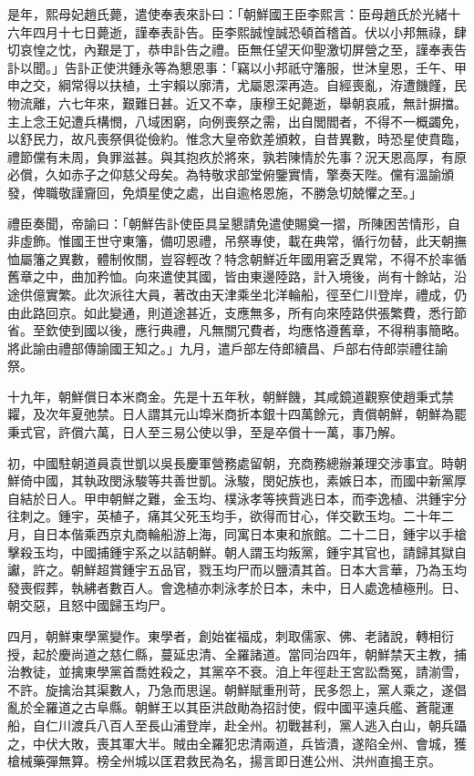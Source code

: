 \begin{pinyinscope}
是年，熙母妃趙氏薨，遣使奉表來訃曰：「朝鮮國王臣李熙言：臣母趙氏於光緒十六年四月十七日薨逝，謹奉表訃告。臣李熙誠惶誠恐頓首稽首。伏以小邦無祿，肆切哀惶之忱，內艱是丁，恭申訃告之禮。臣無任望天仰聖激切屏營之至，謹奉表告訃以聞。」告訃正使洪鍾永等為懇恩事：「竊以小邦祇守籓服，世沐皇恩，壬午、甲申之交，綱常得以扶植，土宇賴以廓清，尤屬恩深再造。自經喪亂，洊遭饑饉，民物流離，六七年來，艱難日甚。近又不幸，康穆王妃薨逝，舉朝哀戚，無計摒擋。主上念王妃遭兵構憫，八域困窮，向例喪祭之需，出自閭閻者，不得不一概蠲免，以舒民力，故凡喪祭俱從儉約。惟念大皇帝欽差頒敕，自昔異數，時恐星使賁臨，禮節儻有未周，負罪滋甚。與其抱疚於將來，孰若陳情於先事？況天恩高厚，有原必償，久如赤子之仰慈父母矣。為特敬求部堂俯鑒實情，擎奏天陛。儻有溫諭頒發，俾職敬謹齎回，免煩星使之處，出自逾格恩施，不勝急切兢懼之至。」

禮臣奏聞，帝諭曰：「朝鮮告訃使臣具呈懇請免遣使賜奠一摺，所陳困苦情形，自非虛飾。惟國王世守東籓，備叨恩禮，吊祭專使，載在典常，循行勿替，此天朝撫恤屬籓之異數，體制攸關，豈容輕改？特念朝鮮近年國用窘乏異常，不得不於率循舊章之中，曲加矜恤。向來遣使其國，皆由東邊陸路，計入境後，尚有十餘站，沿途供億實繁。此次派往大員，著改由天津乘坐北洋輪船，徑至仁川登岸，禮成，仍由此路回京。如此變通，則道途甚近，支應無多，所有向來陸路供張繁費，悉行節省。至欽使到國以後，應行典禮，凡無關冗費者，均應恪遵舊章，不得稍事簡略。將此諭由禮部傳諭國王知之。」九月，遣戶部左侍郎續昌、戶部右侍郎崇禮往諭祭。

十九年，朝鮮償日本米商金。先是十五年秋，朝鮮饑，其咸鏡道觀察使趙秉式禁糶，及次年夏弛禁。日人謂其元山埠米商折本銀十四萬餘元，責償朝鮮，朝鮮為罷秉式官，許償六萬，日人至三易公使以爭，至是卒償十一萬，事乃解。

初，中國駐朝道員袁世凱以吳長慶軍營務處留朝，充商務總辦兼理交涉事宜。時朝鮮倚中國，其執政閔泳駿等共善世凱。泳駿，閔妃族也，素嫉日本，而國中新黨厚自結於日人。甲申朝鮮之難，金玉均、樸泳孝等挾貲逃日本，而李逸植、洪鍾宇分往刺之。鍾宇，英植子，痛其父死玉均手，欲得而甘心，佯交歡玉均。二十年二月，自日本偕乘西京丸商輪船游上海，同寓日本東和旅館。二十二日，鍾宇以手槍擊殺玉均，中國捕鍾宇系之以詰朝鮮。朝人謂玉均叛黨，鍾宇其官也，請歸其獄自讞，許之。朝鮮超賞鍾宇五品官，戮玉均尸而以鹽漬其首。日本大言華，乃為玉均發喪假葬，執紼者數百人。會逸植亦刺泳孝於日本，未中，日人處逸植極刑。日、朝交惡，且怒中國歸玉均尸。

四月，朝鮮東學黨變作。東學者，創始崔福成，刺取儒家、佛、老諸說，轉相衍授，起於慶尚道之慈仁縣，蔓延忠清、全羅諸道。當同治四年，朝鮮禁天主教，捕治教徒，並擒東學黨首喬姓殺之，其黨卒不衰。洎上年徑赴王宮訟喬冤，請湔雪，不許。旋擒治其渠數人，乃急而思逞。朝鮮賦重刑苛，民多怨上，黨人乘之，遂倡亂於全羅道之古阜縣。朝鮮王以其臣洪啟勛為招討使，假中國平遠兵艦、蒼龍運船，自仁川渡兵八百人至長山浦登岸，赴全州。初戰甚利，黨人逃入白山，朝兵躡之，中伏大敗，喪其軍大半。賊由全羅犯忠清兩道，兵皆潰，遂陷全州、會城，獲槍械藥彈無算。榜全州城以匡君救民為名，揚言即日進公州、洪州直搗王京。


\end{pinyinscope}
